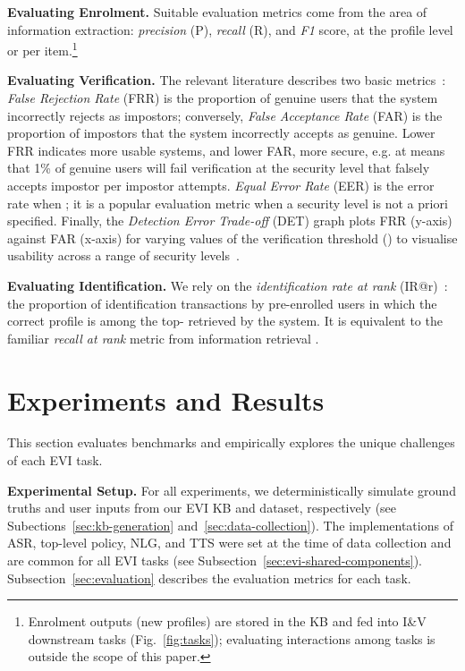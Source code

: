 \documentclass[11pt]{article}
\newcommand{\sparagraph}[1]{\noindent\textbf{#1.}}
\newcommand{\rparagraph}[1]{\vspace{1.4mm}\noindent\textbf{#1.}}
\begin{document}
{\sparagraph{Evaluating Enrolment}
Suitable evaluation metrics come from the area of information extraction: \textit{precision} (P), \textit{recall} (R), and \textit{F1} score, at the profile level or per item.\footnote{
Enrolment outputs (new profiles) are stored in the KB and fed into I\&V downstream tasks (Fig.~\ref{fig:tasks});
evaluating interactions among tasks is outside the scope of this paper.}

\rparagraph{Evaluating Verification}
The relevant literature describes two basic metrics~\cite{el2012evaluation}:
\textit{False Rejection Rate} (FRR)
is the proportion of genuine users
that the system incorrectly rejects as impostors;
conversely,
\textit{False Acceptance Rate} (FAR)
is the proportion of impostors
that the system incorrectly accepts as genuine.
Lower FRR indicates more usable systems,
and lower FAR, more secure,
e.g.  at 
means that 1\% of genuine users will fail verification
at the security level
that falsely accepts  impostor per  impostor attempts.
\textit{Equal Error Rate} (EER) is the error rate when ;
it is a popular evaluation metric when a security level is not a priori specified.
Finally, the \textit{Detection Error Trade-off} (DET) graph
plots FRR (y-axis) against FAR (x-axis)
for varying values of the verification threshold ()
to visualise usability across a range of security levels~\cite{martin1997det}.


\rparagraph{Evaluating Identification}
We rely on the \textit{identiﬁcation rate at rank } (IR@r)~\cite{el2012evaluation}:
the proportion of identification transactions by pre-enrolled users
in which the correct profile is among the top- retrieved by the system.
It is equivalent to the familiar \textit{recall at rank} metric from information retrieval \cite{manning2008ir}.



 
\section{Experiments and Results}
\label{sec:experiments}


This section evaluates benchmarks and empirically explores the unique challenges of each EVI task.



\rparagraph{Experimental Setup}
For all experiments,
we deterministically simulate 
ground truths and 
user inputs
from our EVI KB and dataset,
respectively 
(see Subections~\ref{sec:kb-generation} and~\ref{sec:data-collection}).
The implementations of
ASR, top-level policy, NLG, and TTS
were set at the time of data collection
and are common for all EVI tasks (see Subsection~\ref{sec:evi-shared-components}).
Subsection~\ref{sec:evaluation} describes
the evaluation metrics for each task.





}
\end{document}
